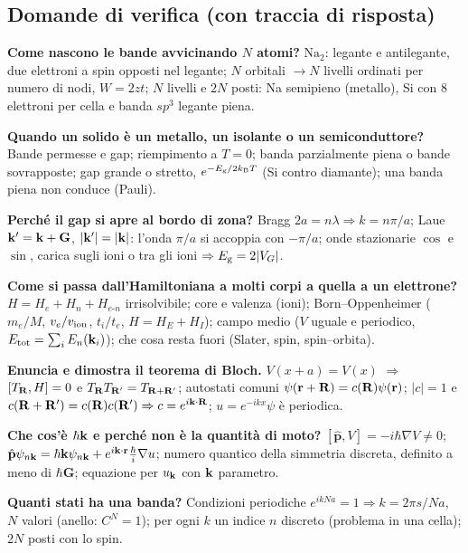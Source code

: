 \documentclass[11pt,a4paper]{article}
\begin{document}
\subsection*{Domande di verifica (con traccia di risposta)}
\begin{domande}
\item \textbf{Come nascono le bande avvicinando $N$ atomi?} $\mathrm{Na_2}$: legante e antilegante, due elettroni a spin opposti nel legante; $N$ orbitali
$\to N$ livelli ordinati per numero di nodi, $W=2zt$; $N$ livelli e $2N$ posti: Na semipieno (metallo), Si con 8 elettroni per cella e banda $sp^3$ legante piena.
\item \textbf{Quando un solido è un metallo, un isolante o un semiconduttore?} Bande permesse e gap; riempimento a $T=0$; banda parzialmente piena o bande sovrapposte;
gap grande o stretto, $e^{-E_{\mathrm g}/2k_{\mathrm B} T}$ (Si contro diamante); una banda piena non conduce (Pauli).
\item \textbf{Perché il gap si apre al bordo di zona?} Bragg $2a=n\lambda\Rightarrow k=n\pi/a$; Laue $\mathbf k'=\mathbf k+\mathbf G$, $|\mathbf k'|=|\mathbf k|$: l'onda $\pi/a$ si
accoppia con $-\pi/a$; onde stazionarie $\cos$ e $\sin$, carica sugli ioni o tra gli ioni $\Rightarrow E_{\mathrm g}=2|V_G|$.
\item \textbf{Come si passa dall'Hamiltoniana a molti corpi a quella a un elettrone?} $H=H_e+H_n+H_{e\text{-}n}$ irrisolvibile; core e valenza (ioni);
Born--Oppenheimer ($m_e/M$, $v_e/v_{\mathrm{ion}}$, $t_i/t_e$, $H=H_E+H_I$); campo medio ($V$ uguale e periodico, $E_{\mathrm{tot}}=\sum_iE_n(\mathbf k_i)$); che cosa resta fuori (Slater, spin, spin--orbita).
\item \textbf{Enuncia e dimostra il teorema di Bloch.} $V(x+a)=V(x)$ $\Rightarrow$ $[T_{\mathbf R},H]=0$ e $T_{\mathbf R}T_{\mathbf R'}=T_{\mathbf R+\mathbf R'}$; autostati comuni
$\psi(\mathbf r+\mathbf R)=c(\mathbf R)\psi(\mathbf r)$; $|c|=1$ e $c(\mathbf R+\mathbf R')=c(\mathbf R)c(\mathbf R')\Rightarrow c=e^{i\mathbf k\cdot\mathbf R}$; $u=e^{-ikx}\psi$ è periodica.
\item \textbf{Che cos'è $\hbar\mathbf k$ e perché non è la quantità di moto?} $[\hat{\mathbf p},V]=-i\hbar\nabla V\ne0$; $\hat{\mathbf p}\psi_{n\mathbf k}=\hbar\mathbf k\psi_{n\mathbf k}+e^{i\mathbf k\cdot\mathbf r}\frac\hbar i\nabla u$;
numero quantico della simmetria discreta, definito a meno di $\hbar\mathbf G$; equazione per $u_{\mathbf k}$ con $\mathbf k$ parametro.
\item \textbf{Quanti stati ha una banda?} Condizioni periodiche $e^{ikNa}=1\Rightarrow k=2\pi s/Na$, $N$ valori (anello: $C^N=1$); per ogni $k$ un indice $n$
discreto (problema in una cella); $2N$ posti con lo spin.

\end{domande}
\end{document}
